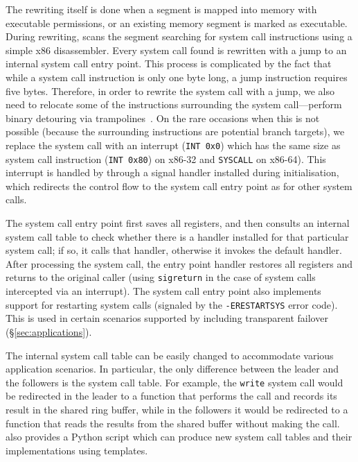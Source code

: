 The rewriting itself is done when a segment is mapped into memory with
executable permissions, or an existing memory segment is marked as
executable.  
During rewriting, \varan scans the segment searching for system call
instructions using a simple x86 disassembler.  Every system call found
is rewritten with a jump to an internal system call entry point. This
process is complicated by the fact that while a system call
instruction is only one byte long, a jump instruction requires five
bytes.  Therefore, in order to rewrite the system call with a jump, we
also need to relocate some of the instructions surrounding the system
call---\ie perform binary detouring via trampolines~\cite{detours}.
On the rare occasions when this is not possible (\eg because the
surrounding instructions are potential branch targets), we replace the
system call with an interrupt (\ie \lstinline`INT 0x0`) which has the
same size as system call instruction (\ie \lstinline`INT 0x80`) on
x86-32 and \lstinline`SYSCALL` on x86-64).  This interrupt is handled by
\varan through a signal handler installed during initialisation, which
redirects the control flow to the system call entry point as for other
system calls.

The system call entry point first saves all registers, and then
consults an internal system call table to check whether there is a
handler installed for that particular system call; if so, it calls
that handler, otherwise it invokes the default handler.  After
processing the system call, the entry point handler restores all
registers and returns to the original caller (using
\lstinline`sigreturn` in the case of system calls intercepted via an
interrupt). The system call entry point also implements support for
restarting system calls (\ie signaled by the \lstinline`-ERESTARTSYS`
error code). This is used in certain scenarios supported by \varan
including transparent failover (\S\ref{sec:applications}).

The internal system call table can be easily changed to accommodate
various application scenarios.  In particular, the only difference
between the leader and the followers is the system call table. For
example, the \lstinline`write` system call would be redirected in the leader
to a function that performs the call and records its result in the
shared ring buffer, while in the followers it would be redirected to a
function that reads the results from the shared buffer without making
the call.
\varan  also provides a Python script which can produce new system call tables
and their implementations using templates.

